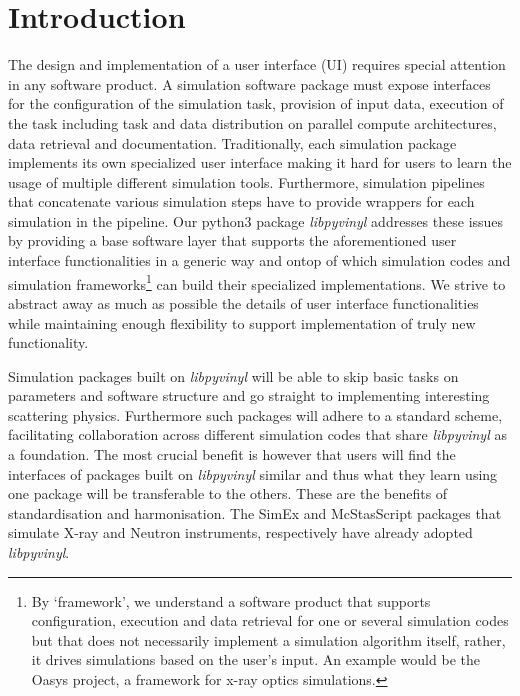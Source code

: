 \documentclass[11pt, a4paper]{article}
\begin{document}
\newpage
{}
\newpage
\tableofcontents
\newpage

\section{Introduction}
The design and
implementation of a user interface (UI) requires special attention in any
software product. A simulation software package must expose interfaces for
the configuration of the simulation task, provision of input data, execution of
the task including task and data distribution on parallel compute architectures,
data retrieval and documentation. Traditionally, each simulation
package implements its own specialized user interface making it hard for users
to learn the usage of multiple different simulation tools.
Furthermore, simulation pipelines that concatenate various simulation steps have to provide wrappers for each
 simulation in the pipeline. Our python3 package \textit{libpyvinyl} addresses
these issues by providing a base software layer that supports the aforementioned
user interface functionalities in a generic way and ontop of which simulation
codes and simulation frameworks\footnote{By `framework', we
  understand a software product that supports configuration, execution and data
  retrieval
  for one or several simulation codes but that does not necessarily implement a
  simulation algorithm itself, rather, it drives simulations based on the user's
  input. An example would be the Oasys project, a framework for x-ray optics
  simulations.} can build their specialized implementations. We strive to
abstract away as much as possible the details of user interface functionalities
while
maintaining enough flexibility to support implementation of truly new functionality.

Simulation packages built on \textit{libpyvinyl} will be
able to skip basic tasks on parameters and software structure and go straight
to implementing interesting scattering physics. Furthermore such packages
will adhere to a standard scheme, facilitating collaboration across
different simulation codes that share \textit{libpyvinyl} as a foundation.
The most crucial benefit is
however that users will find the interfaces of packages built on
\textit{libpyvinyl} similar and thus what they learn using one package will be
transferable to the others. These are the benefits of standardisation and
harmonisation. The SimEx and McStasScript packages that simulate X-ray and
Neutron instruments, respectively have  already adopted \textit{libpyvinyl}.
\end{document}
